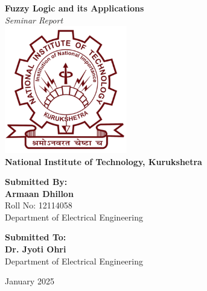 \documentclass[a4paper,12pt]{report}
\begin{document}
\begin{titlepage}
    \centering

    {\Huge \textbf{Fuzzy Logic and its Applications}}\\[0.5cm]
    {\Large \textit{ Seminar Report}}\\[1.5cm]

    \includegraphics[width=0.4\textwidth]{nitkkr.png}\\[1cm] %

    \textbf{\Large National Institute of Technology, Kurukshetra}\\[1cm]
    
    \begin{minipage}[t]{0.45\textwidth}
        \raggedright
        \textbf{\large Submitted By:}\\
        {\Large \textbf{Armaan Dhillon}}\\
        {\large Roll No: 12114058}\\
        {\large Department of Electrical Engineering}\\
    \end{minipage}
    \hfill
    \begin{minipage}[t]{0.45\textwidth}
        \raggedleft
        \textbf{\large Submitted To:}\\
        {\Large \textbf{Dr. Jyoti Ohri}}\\
        {\large Department of Electrical Engineering}\\
    \end{minipage}

    \vfill

    {\large January 2025}
\end{titlepage}
\end{document}
